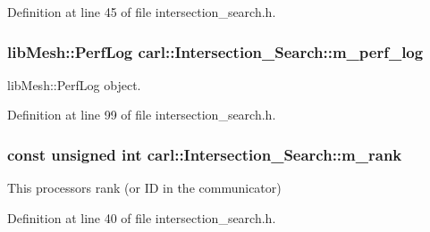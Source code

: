 Definition at line 45 of file intersection\+\_\+search.\+h.

\hypertarget{classcarl_1_1_intersection___search_aebe6210287a36909206b1a59f9cd17e0}{}
\subsubsection[{m\+\_\+perf\+\_\+log}]{\setlength{\rightskip}{0pt plus 5cm}lib\+Mesh\+::\+Perf\+Log carl\+::\+Intersection\+\_\+\+Search\+::m\+\_\+perf\+\_\+log\hspace{0.3cm}{\ttfamily [protected]}}\label{classcarl_1_1_intersection___search_aebe6210287a36909206b1a59f9cd17e0}


lib\+Mesh\+::\+Perf\+Log object. 



Definition at line 99 of file intersection\+\_\+search.\+h.

\hypertarget{classcarl_1_1_intersection___search_a82564dfb7815673fcb9d9e3eb2d03b97}{}
\subsubsection[{m\+\_\+rank}]{\setlength{\rightskip}{0pt plus 5cm}const unsigned int carl\+::\+Intersection\+\_\+\+Search\+::m\+\_\+rank\hspace{0.3cm}{\ttfamily [protected]}}\label{classcarl_1_1_intersection___search_a82564dfb7815673fcb9d9e3eb2d03b97}


This processor\textquotesingle{}s rank (or I\+D in the communicator) 



Definition at line 40 of file intersection\+\_\+search.\+h.

\hypertarget{classcarl_1_1_intersection___search_aea1aa01a86b5cdb7bea5ac9e7f73105f}{}
